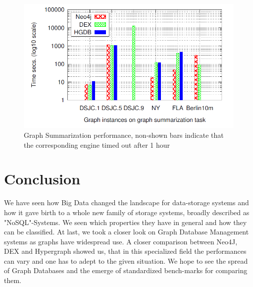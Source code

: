 \documentclass{acm_proc_article-sp}
\begin{document}
\begin{figure}[hbtp]
	\centering
	\includegraphics[scale=0.32]{summarization.png}
	\caption{Graph Summarization performance, non-shown bars indicate that
		the corresponding engine timed out after 1 hour\cite{comparision}}
\end{figure}

\section{Conclusion}

We have seen how Big Data changed the landscape for data-storage systems and how it gave birth to a whole new family of storage systems, broadly described as "NoSQL"-Systems. We seen which properties they have in general and how they can be classified. At last, we took a closer look on Graph Database Management systems as graphs have widespread use. A closer comparison between Neo4J, DEX and Hypergraph showed us, that in this specialized field the performances can vary and one has to adept to the given situation. We hope to see the spread of Graph Databases and the emerge of standardized bench-marks for comparing them.


%

%
%
\end{document}
